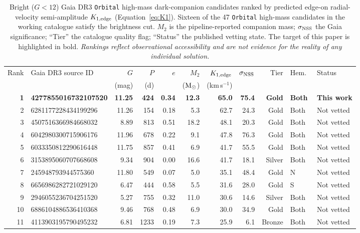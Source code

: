 \documentclass[usenatbib,fleqn]{mnras}
\newcommand{\Msun}{{\rm M}_\odot}
\begin{document}
\begin{table}
\centering
\caption{Bright ($G < 12$) Gaia DR3 \texttt{Orbital} high-mass
dark-companion candidates ranked by predicted edge-on
radial-velocity semi-amplitude $K_{1,\rm edge}$
(Equation~\ref{eq:K1}).  Sixteen of the 47 \texttt{Orbital}
high-mass candidates in the working catalogue satisfy the
brightness cut.  $M_2$ is the pipeline-reported companion mass;
$\sigma_{\rm NSS}$ the Gaia significance; ``Tier'' the catalogue
quality flag; ``Status'' the published vetting state.
The target of this paper is highlighted in bold.
\emph{Rankings reflect observational accessibility and are not
evidence for the reality of any individual solution.}}
\label{tab:population}
\begin{tabular}{rlrrrrrrrll}
\toprule
Rank & Gaia DR3 source ID & $G$ & $P$ & $e$ & $M_2$ & $K_{1,\rm edge}$ &
$\sigma_{\rm NSS}$ & Tier & Hem.\ & Status \\
 & & (mag) & (d) & & ($\Msun$) & (km\,s$^{-1}$) & & & & \\
\midrule
\textbf{1} & \textbf{4277855016732107520} & \textbf{11.25} & \textbf{424} & \textbf{0.34} & \textbf{12.3} & \textbf{65.0} & \textbf{75.4} & \textbf{Gold} & \textbf{Both} & \textbf{This work} \\
2 & 6281177228434199296 & 11.26 & 154 & 0.18 & 5.3 & 62.7 & 24.3 & Gold & Both & Not vetted \\
3 & 4507516366984668032 & 8.89 & 813 & 0.51 & 18.2 & 48.1 & 20.3 & Gold & Both & Not vetted \\
4 & 6042980300715906176 & 11.96 & 678 & 0.22 & 9.1 & 47.8 & 76.3 & Gold & Both & Not vetted \\
5 & 6033350812290616448 & 11.75 & 857 & 0.41 & 6.9 & 41.7 & 55.5 & Gold & Both & Not vetted \\
6 & 3153895060707668608 & 9.34 & 904 & 0.00 & 16.6 & 41.7 & 18.1 & Silver & Both & Not vetted \\
7 & 245948793944575360  & 11.80 & 549 & 0.07 & 5.0 & 35.1 & 48.4 & Gold & N & Not vetted \\
8 & 6656986282721029120 & 6.47 & 444 & 0.58 & 5.5 & 31.6 & 28.0 & Gold & S & Not vetted \\
9 & 2946055236704251520 & 5.27 & 755 & 0.32 & 11.0 & 30.6 & 14.6 & Silver & Both & Not vetted \\
10 & 6886104886536410368 & 9.46 & 768 & 0.48 & 6.9 & 30.0 & 34.9 & Gold & Both & Not vetted \\
11 & 4113903195790495232 & 6.81 & 1233 & 0.19 & 7.3 & 25.9 & 6.1 & Bronze & Both & Not vetted \\

\end{tabular}
\end{table}
\end{document}
